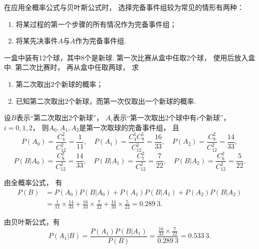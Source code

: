 在应用全概率公式与贝叶斯公式时，
选择完备事件组较为常见的情形有两种：
\begin{enumerate}
	\item 将某过程的第一个步骤的所有情况作为完备事件组；

	\item 将某先决事件\(A\)与\(\overline{A}\)作为完备事件组.
\end{enumerate}

\begin{example}
一盒中装有12个球，其中8个是新球.
第一次比赛从盒中任取2个球，
使用后放入盒中.
第二次比赛时，
再从盒中任取两球，
求\begin{enumerate}
	\item 第二次取出2个新球的概率；
	\item 已知第二次取出2个新球，而第一次仅取出一个新球的概率.
\end{enumerate}
\begin{solution}
设\(B\)表示“第二次取出2个新球”，
\(A_i\)表示“第一次取出2个球中有\(i\)个新球”，
\(i=0,1,2\)，
则\(A_0,A_1,A_2\)是第一次取球的完备事件组，
且\begin{equation*}
	P(A_0) = \frac{C_4^2}{C_{12}^2} = \frac{1}{11},
	\quad
	P(A_1) = \frac{C_4^1 C_8^1}{C_{12}^2} = \frac{16}{33},
	\quad
	P(A_2) = \frac{C_8^2}{C_{12}^2} = \frac{14}{33},
	\end{equation*}\begin{equation*}
	P(B \vert A_0) = \frac{C_8^2}{C_{12}^2} = \frac{14}{33},
	\quad
	P(B \vert A_1) = \frac{C_7^2}{C_{12}^2} = \frac{7}{22},
	\quad
	P(B \vert A_2) = \frac{C_6^2}{C_{12}^2} = \frac{5}{22}.
\end{equation*}

由全概率公式，
有\begin{align*}
	P(B) &= P(A_0) P(B \vert A_0)
		+ P(A_1) P(B \vert A_1)
		+ P(A_2) P(B \vert A_2) \\
	&= \frac{1}{11} \times \frac{14}{33}
		+ \frac{16}{33} \times \frac{7}{22}
		+ \frac{14}{33} \times \frac{5}{22}
	= 0.289~3.
\end{align*}

由贝叶斯公式，有\begin{equation*}
	P(A_1 \vert B) = \frac{P(A_1) P(B \vert A_1)}{P(B)}
	= \frac{\frac{16}{33} \times \frac{7}{22}}{0.289~3}
	= 0.533~3.
\end{equation*}
\end{solution}
\end{example}
